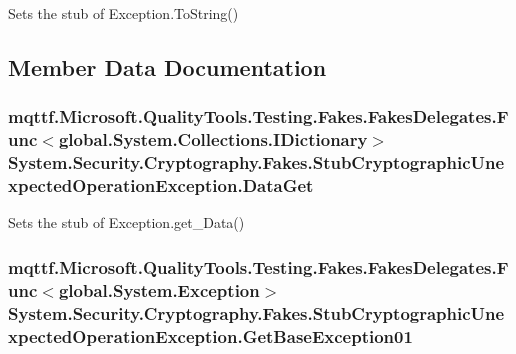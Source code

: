 Sets the stub of Exception.\-To\-String()



\subsection{Member Data Documentation}
\hypertarget{class_system_1_1_security_1_1_cryptography_1_1_fakes_1_1_stub_cryptographic_unexpected_operation_exception_a3e9bcfe2d379f3d3261a8ff707e78f03}{
\subsubsection[{Data\-Get}]{\setlength{\rightskip}{0pt plus 5cm}mqttf.\-Microsoft.\-Quality\-Tools.\-Testing.\-Fakes.\-Fakes\-Delegates.\-Func$<$global.\-System.\-Collections.\-I\-Dictionary$>$ System.\-Security.\-Cryptography.\-Fakes.\-Stub\-Cryptographic\-Unexpected\-Operation\-Exception.\-Data\-Get}}\label{class_system_1_1_security_1_1_cryptography_1_1_fakes_1_1_stub_cryptographic_unexpected_operation_exception_a3e9bcfe2d379f3d3261a8ff707e78f03}


Sets the stub of Exception.\-get\-\_\-\-Data()

\hypertarget{class_system_1_1_security_1_1_cryptography_1_1_fakes_1_1_stub_cryptographic_unexpected_operation_exception_a3c9be53742fec8d75df375d5ff36a873}{
\subsubsection[{Get\-Base\-Exception01}]{\setlength{\rightskip}{0pt plus 5cm}mqttf.\-Microsoft.\-Quality\-Tools.\-Testing.\-Fakes.\-Fakes\-Delegates.\-Func$<$global.\-System.\-Exception$>$ System.\-Security.\-Cryptography.\-Fakes.\-Stub\-Cryptographic\-Unexpected\-Operation\-Exception.\-Get\-Base\-Exception01}}\label{class_system_1_1_security_1_1_cryptography_1_1_fakes_1_1_stub_cryptographic_unexpected_operation_exception_a3c9be53742fec8d75df375d5ff36a873}


